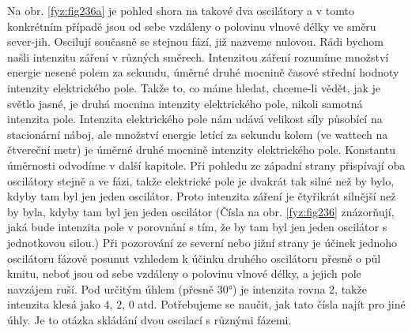 {    Na obr. \ref{fyz:fig236a} je pohled shora na takové dva oscilátory a v tomto konkrétním případě 
    jsou od sebe vzdáleny o polovinu vlnové délky ve směru sever-jih. Oscilují současně se stejnou 
    fází, již nazveme nulovou. Rádi bychom našli intenzitu záření v různých směrech. Intenzitou 
    záření rozumíme množství energie nesené polem za sekundu, úměrné druhé mocnině časové střední 
    hodnoty intenzity elektrického pole. Takže to, co máme hledat, chceme-li vědět, jak je světlo 
    jasné, je druhá mocnina intenzity elektrického pole, nikoli samotná intenzita pole. Intenzita 
    elektrického pole nám udává velikost síly působící na stacionární náboj, ale množství energie 
    letící za sekundu kolem (ve wattech na čtvereční metr) je úměrné druhé mocnině intenzity 
    elektrického pole. Konstantu úměrnosti odvodíme v další kapitole. Při pohledu ze západní strany 
    přispívají oba oscilátory stejně a ve fázi, takže elektrické pole je dvakrát tak silné než by 
    bylo, kdyby tam byl jen jeden oscilátor. Proto intenzita záření je čtyřikrát silnější než by 
    byla, kdyby tam byl jen jeden oscilátor (Čísla na obr. \ref{fyz:fig236} znázorňují, jaká bude 
    intenzita pole v porovnání s tím, že by tam byl jen jeden oscilátor s jednotkovou silou.) Při 
    pozorování ze severní nebo jižní strany je účinek jednoho oscilátoru fázově posunut vzhledem k 
    účinku druhého oscilátoru přesně o půl kmitu, neboť jsou od sebe vzdáleny o polovinu vlnové 
    délky, a jejich pole navzájem ruší. Pod určitým úhlem (přesně \ang{30}) je intenzita rovna 
    \(2\), takže intenzita klesá jako \(4\), \(2\), \(0\) atd. Potřebujeme se naučit, jak tato 
    čísla najít pro jiné úhly. Je to otázka skládání dvou oscilací s různými fázemi.
    
}

